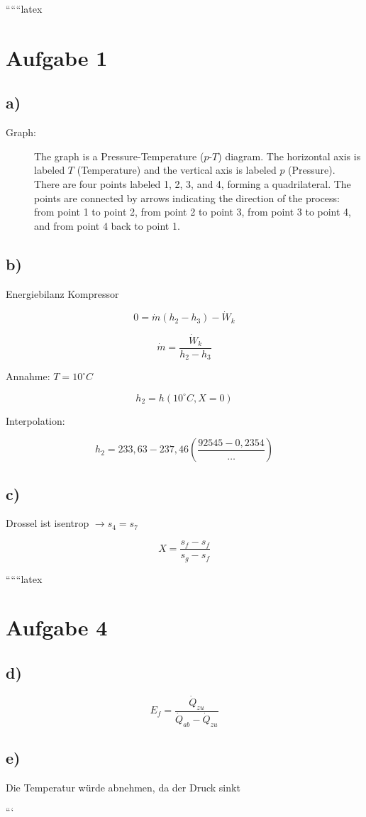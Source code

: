 
``````latex


\section*{Aufgabe 1}

\subsection*{a)}

\begin{description}
    \item[Graph:] The graph is a Pressure-Temperature ($p$-$T$) diagram. The horizontal axis is labeled $T$ (Temperature) and the vertical axis is labeled $p$ (Pressure). There are four points labeled 1, 2, 3, and 4, forming a quadrilateral. The points are connected by arrows indicating the direction of the process: from point 1 to point 2, from point 2 to point 3, from point 3 to point 4, and from point 4 back to point 1.
\end{description}

\subsection*{b)}

Energiebilanz Kompressor

\[
0 = \dot{m} (h_2 - h_3) - \dot{W}_k
\]

\[
\dot{m} = \frac{\dot{W}_k}{h_2 - h_3}
\]

Annahme: $T = 10^\circ C$

\[
h_2 = h(10^\circ C, X=0)
\]

Interpolation:

\[
h_2 = 233,63 - 237,46 \left( \frac{92545 - 0,2354}{\dots} \right)
\]

\subsection*{c)}

Drossel ist isentrop $\rightarrow s_4 = s_7$

\[
X = \frac{s_f - s_f}{s_g - s_f}
\]

``````latex


\section*{Aufgabe 4}

\subsection*{d)}
\begin{equation*}
    E_f = \frac{\dot{Q}_{zu}}{\dot{Q}_{ab} - \dot{Q}_{zu}}
\end{equation*}

\subsection*{e)}
Die Temperatur würde abnehmen, da der Druck sinkt

```